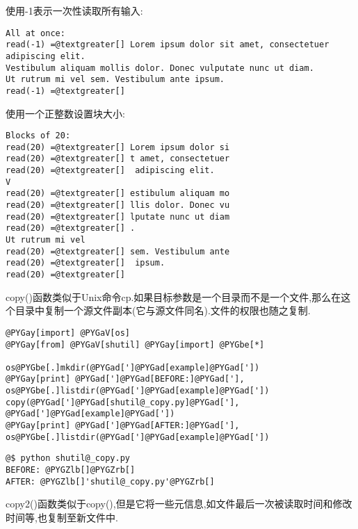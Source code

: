 \documentclass[a4paper,10pt,english]{manual}
\begin{document}
使用-1表示一次性读取所有输入:

\begin{Verbatim}[commandchars=@\[\]]
All at once:
read(-1) =@textgreater[] Lorem ipsum dolor sit amet, consectetuer adipiscing elit.
Vestibulum aliquam mollis dolor. Donec vulputate nunc ut diam.
Ut rutrum mi vel sem. Vestibulum ante ipsum.
read(-1) =@textgreater[]
\end{Verbatim}

使用一个正整数设置块大小:

\begin{Verbatim}[commandchars=@\[\]]
Blocks of 20:
read(20) =@textgreater[] Lorem ipsum dolor si
read(20) =@textgreater[] t amet, consectetuer
read(20) =@textgreater[]  adipiscing elit.
V
read(20) =@textgreater[] estibulum aliquam mo
read(20) =@textgreater[] llis dolor. Donec vu
read(20) =@textgreater[] lputate nunc ut diam
read(20) =@textgreater[] .
Ut rutrum mi vel
read(20) =@textgreater[] sem. Vestibulum ante
read(20) =@textgreater[]  ipsum.
read(20) =@textgreater[]
\end{Verbatim}

copy()函数类似于Unix命令cp.如果目标参数是一个目录而不是一个文件,那么在这个目录中复制一个源文件副本(它与源文件同名).文件的权限也随之复制.

\begin{Verbatim}[commandchars=@\[\]]
@PYGay[import] @PYGaV[os]
@PYGay[from] @PYGaV[shutil] @PYGay[import] @PYGbe[*]

os@PYGbe[.]mkdir(@PYGad[']@PYGad[example]@PYGad['])
@PYGay[print] @PYGad[']@PYGad[BEFORE:]@PYGad['], os@PYGbe[.]listdir(@PYGad[']@PYGad[example]@PYGad['])
copy(@PYGad[']@PYGad[shutil@_copy.py]@PYGad['], @PYGad[']@PYGad[example]@PYGad['])
@PYGay[print] @PYGad[']@PYGad[AFTER:]@PYGad['], os@PYGbe[.]listdir(@PYGad[']@PYGad[example]@PYGad['])
\end{Verbatim}

\begin{Verbatim}[commandchars=@\[\]]
@$ python shutil@_copy.py
BEFORE: @PYGZlb[]@PYGZrb[]
AFTER: @PYGZlb[]'shutil@_copy.py'@PYGZrb[]
\end{Verbatim}

copy2()函数类似于copy(),但是它将一些元信息,如文件最后一次被读取时间和修改时间等,也复制至新文件中.
\end{document}
